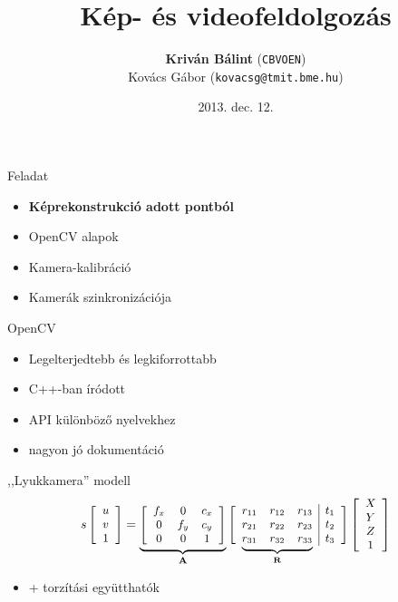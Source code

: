 \documentclass[17pt,xcolor=x11names]{beamer}
\title[Kép- és videofeldolgozás]{Kép- és videofeldolgozás}
\subtitle{}
\author[Kriván Bálint]{\textbf{Kriván Bálint} (\texttt{CBVOEN})\\[10pt]
\footnotesize Kovács Gábor (\texttt{kovacsg@tmit.bme.hu})}
\institute[BME]{}
\date{2013. dec. 12.}
\newcommand\undermat[2]{%
  \makebox[0pt][l]{$\smash{\underbrace{\phantom{%
    \begin{matrix}#2\end{matrix}}}_{\text{$#1$}}}$}#2}
\begin{document}
\begin{frame}\maketitle\end{frame}

\begin{frame}{Feladat}
\begin{itemize}
\item \textbf{Képrekonstrukció adott pontból}
\item OpenCV alapok
\item Kamera-kalibráció
\item Kamerák szinkronizációja
\end{itemize}
\end{frame}

\begin{frame}{OpenCV}
\begin{itemize}
\item Legelterjedtebb és legkiforrottabb
\item C++-ban íródott
\item API különböző nyelvekhez
\item nagyon jó dokumentáció
\end{itemize}
\end{frame}

\begin{frame}{,,Lyukkamera'' modell}
\[\small s \left[\begin{array}{c}
u \\ 
v \\
1
\end{array}\right] = \underbrace{\left[\begin{array}{ccc}
f_x & 0 & c_x \\ 
0 & f_y & c_y \\
0 & 0 & 1
\end{array}\right]}_{\mathbf{A}} \left[\begin{array}{ccc|c}
r_{11} & r_{12} & r_{13} & t_1 \\ 
r_{21} & r_{22} & r_{23} & t_2 \\
\undermat{\mathbf{R}}{r_{31} & r_{32} & r_{33}} & t_3 \\
\end{array}\right] \left[\begin{array}{c}
X \\ 
Y \\
Z \\
1
\end{array}\right]\]
\begin{itemize}
\item + torzítási együtthatók
\end{itemize}
\end{frame}
\end{document}
